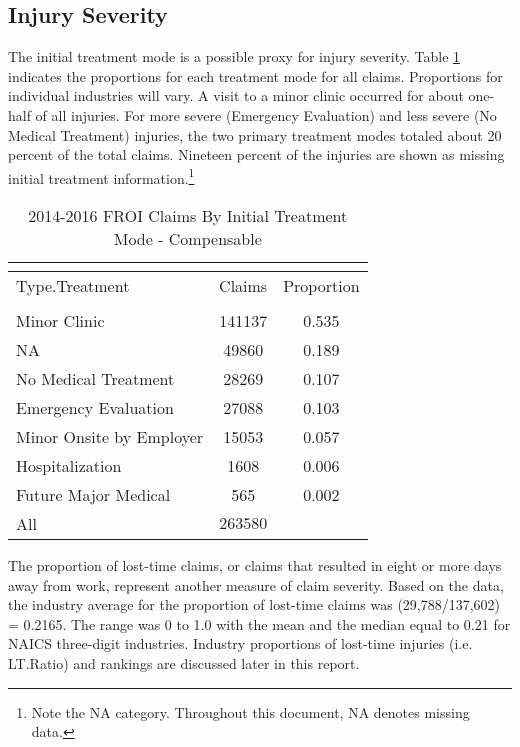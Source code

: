 \documentclass[9pt, oneside]{article}   	%
\begin{document}
\pagebreak




\subsection{Injury Severity}

The initial treatment mode is a possible proxy for injury severity. Table \ref{Table: Treat} indicates the proportions for each treatment mode for all claims. Proportions for individual industries will vary. A visit to a minor clinic occurred for about one-half of all injuries. For more severe (Emergency Evaluation) and less severe (No Medical Treatment) injuries, the two primary treatment modes totaled about 20 percent of the total claims. Nineteen percent of the injuries are shown as missing initial treatment information.\footnote{Note the NA category. Throughout this document, NA denotes missing data.}



\begin{longtable}{p{2in}cc}
\caption{2014-2016 FROI Claims By Initial Treatment Mode  - Compensable}\\
\label{Table: Treat}\\
\hline
\toprule
Type.Treatment & Claims & Proportion\\
  \midrule\\ [-1\normalbaselineskip]\hline\endhead\hline\endfoot
\hline
Minor Clinic & 141137 & 0.535\\
NA & 49860 & 0.189\\
No Medical Treatment & 28269 & 0.107\\
Emergency Evaluation & 27088 & 0.103\\
Minor Onsite by Employer & 15053 & 0.057\\
Hospitalization & 1608 & 0.006\\
Future Major Medical & 565 & 0.002\\
\cline{1-1} \cline{2-2} \cline{3-3} %
All  & $263580$ &  \\
\hline 
\end{longtable}

The proportion of lost-time claims, or claims that resulted in eight or more days away from work, represent another measure of claim severity. Based on the data, the industry average for the proportion of lost-time claims was (29,788/137,602) = 0.2165. The range was 0 to 1.0 with the mean and the median equal to 0.21 for NAICS three-digit industries. Industry proportions of lost-time injuries (i.e. LT.Ratio) and rankings are discussed  later in this report.
\end{document}
